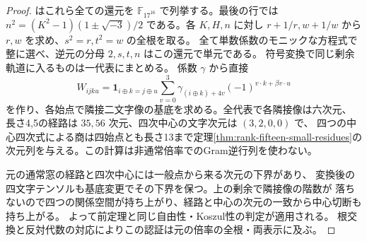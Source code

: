 \begin{proof}
 はこれら全ての還元を
$\mathbb F_{17^{16}}$ で列挙する。最後の行では
$n^2=(K^2-1)(1\pm\sqrt{-3})/2$ である。各 $K,H,n$ に対し
$r+1/r,w+1/w$ から $r,w$ を求め、$s^2=r,t^2=w$ の全根を取る。
全て単数係数のモニックな方程式で整に選べ、逆元の分母 $2,s,t,n$ はこの還元で単元である。
符号変換で同じ剰余軌道に入るものは一代表にまとめる。
係数 $\gamma$ から直接
\[
 W_{ijku}=\boldsymbol1_{i\oplus k=j\oplus u}
  \sum_{v=0}^3 \gamma_{(i\oplus k)+4v}(-1)^{v\cdot k+\beta v\cdot u}
\]
を作り、各始点で隣接二文字像の基底を求める。全代表で各隣接像は六次元、
長さ4,5の経路は $35,56$ 次元、四次中心の文字次元は $(3,2,0,0)$ で、
四つの中心四次式による商は四始点とも長さ13まで定理\ref{thm:rank-fifteen-small-residues}の
次元列を与える。この計算は非通常倍率でのGram逆行列を使わない。

元の通常窓の経路と四次中心には一般点から来る次元の下界があり、
変換後の四文字テンソルも基底変更でその下界を保つ。上の剰余で隣接像の階数が
落ちないので四つの関係空間が持ち上がり、経路と中心の次元の一致から中心切断も持ち上がる。
よって前定理と同じ自由性・Koszul性の判定が適用される。
根交換と反対代数の対応によりこの認証は元の倍率の全根・両表示に及ぶ。
\end{proof}
